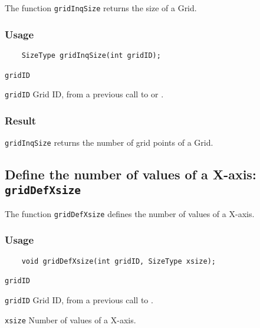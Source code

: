 The function {\texttt{gridInqSize}} returns the size of a Grid.

\subsubsection*{Usage}

\begin{verbatim}
    SizeType gridInqSize(int gridID);
\end{verbatim}

\hspace*{4mm}\begin{minipage}[]{15cm}
\begin{deflist}{\texttt{gridID}\ }
\item[\texttt{gridID}]
Grid ID, from a previous call to {} or {}.

\end{deflist}
\end{minipage}

\subsubsection*{Result}

{\texttt{gridInqSize}} returns the number of grid points of a Grid.



\subsection{Define the number of values of a X-axis: \texttt{gridDefXsize}}
\label{gridDefXsize}

The function {\texttt{gridDefXsize}} defines the number of values of a X-axis.

\subsubsection*{Usage}

\begin{verbatim}
    void gridDefXsize(int gridID, SizeType xsize);
\end{verbatim}

\hspace*{4mm}\begin{minipage}[]{15cm}
\begin{deflist}{\texttt{gridID}\ }
\item[\texttt{gridID}]
Grid ID, from a previous call to {}.
\item[\texttt{xsize}]
Number of values of a X-axis.

\end{deflist}
\end{minipage}


